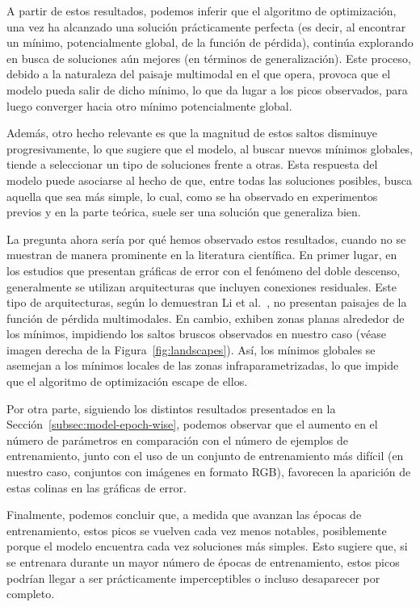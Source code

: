 A partir de estos resultados, podemos inferir que el algoritmo de optimización, una vez ha alcanzado una solución prácticamente perfecta (es decir, al encontrar un mínimo, potencialmente global, de la función de pérdida), continúa explorando en busca de soluciones aún mejores (en términos de generalización). Este proceso, debido a la naturaleza del paisaje multimodal en el que opera, provoca que el modelo pueda salir de dicho mínimo, lo que da lugar a los picos observados, para luego converger hacia otro mínimo potencialmente global.

Además, otro hecho relevante es que la magnitud de estos saltos disminuye progresivamente, lo que sugiere que el modelo, al buscar nuevos mínimos globales, tiende a seleccionar un tipo de soluciones frente a otras. Esta respuesta del modelo puede asociarse al hecho de que, entre todas las soluciones posibles, busca aquella que sea más simple, lo cual, como se ha observado en experimentos previos y en la parte teórica, suele ser una solución que generaliza bien.

La pregunta ahora sería por qué hemos observado estos resultados, cuando no se muestran de manera prominente en la literatura científica. En primer lugar, en los estudios que presentan gráficas de error con el fenómeno del doble descenso, generalmente se utilizan arquitecturas que incluyen conexiones residuales. Este tipo de arquitecturas, según lo demuestran Li et al.~\cite{Li2018}, no presentan paisajes de la función de pérdida multimodales. En cambio, exhiben zonas planas alrededor de los mínimos, impidiendo los saltos bruscos observados en nuestro caso (véase imagen derecha de la Figura~\ref{fig:landscapes}). Así, los mínimos globales se asemejan a los mínimos locales de las zonas infraparametrizadas, lo que impide que el algoritmo de optimización escape de ellos.

Por otra parte, siguiendo los distintos resultados presentados en la Sección~\ref{subsec:model-epoch-wise}, podemos observar que el aumento en el número de parámetros en comparación con el número de ejemplos de entrenamiento, junto con el uso de un conjunto de entrenamiento más difícil (en nuestro caso, conjuntos con imágenes en formato RGB), favorecen la aparición de estas colinas en las gráficas de error.

Finalmente, podemos concluir que, a medida que avanzan las épocas de entrenamiento, estos picos se vuelven cada vez menos notables, posiblemente porque el modelo encuentra cada vez soluciones más simples. Esto sugiere que, si se entrenara durante un mayor número de épocas de entrenamiento, estos picos podrían llegar a ser prácticamente imperceptibles o incluso desaparecer por completo.

\endinput
